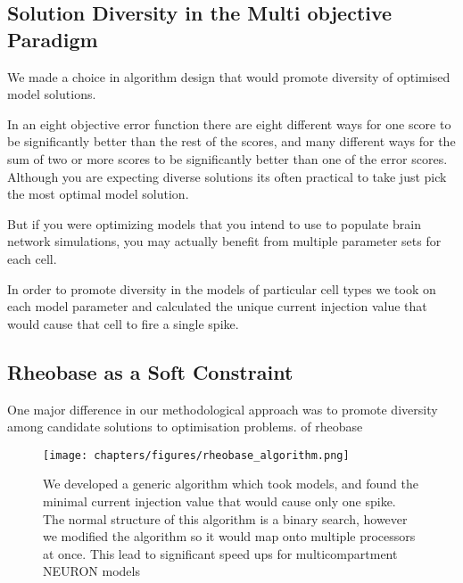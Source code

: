 

\subsection{Solution Diversity in the Multi objective Paradigm}


We made a choice in algorithm design that would promote diversity of optimised model solutions.


In an eight objective error function there are eight different ways for one score to be significantly better than the rest of the scores, and many different ways for the sum of two or more scores to be significantly better than one of the error scores. Although you are expecting diverse solutions its often practical to take just pick the most optimal model solution.

But if you were optimizing models that you intend to use to populate brain network simulations, you may actually benefit from multiple parameter sets for each cell.

In order to promote diversity in the models of particular cell types we took on each model parameter and calculated the unique current injection value that would cause that cell to fire a single spike. 

\subsection{Rheobase as a Soft Constraint}
One major difference in our methodological approach was to promote diversity among candidate solutions to optimisation problems. 
of rheobase 
\begin{figure}    
\begin{center}
\texttt{[image: chapters/figures/rheobase\_algorithm.png]}
\caption{We developed a generic algorithm which took models, and found the minimal current injection value that would cause only one spike. The normal structure of this algorithm is a binary search, however we modified the algorithm so it would map onto multiple processors at once. This lead to significant speed ups for multicompartment NEURON models}

\end{center}
\end{figure}  

